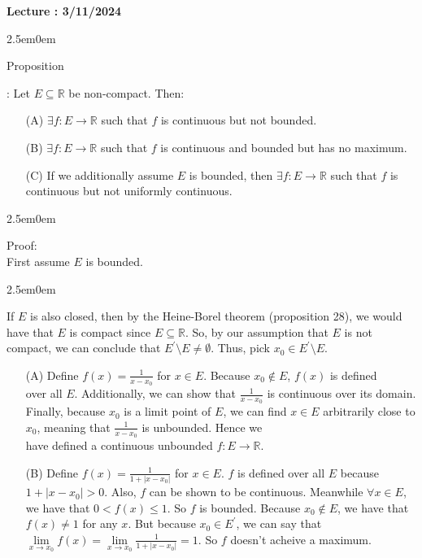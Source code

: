 \documentclass{book}
\newcommand{\hTwo}{%
   \color{MidnightBlue}%
   \fontsize{13}{15}\selectfont%
}
\newcommand{\hThree}{%
   \color{PineGreen}
   \fontsize{13}{15}\selectfont%
}
\newenvironment{myIndent}{%
   \begin{adjustwidth}{2.5em}{0em}%
}{%
   \end{adjustwidth}%
}
\newcommand{\retTwo}{\hfill\bigbreak}
\newcounter{LectureNumber}
\newcommand*{\markLecture}[1]{%
   \stepcounter{LectureNumber}%
   {\huge \color{Black} \textbf{Lecture \theLectureNumber: #1} \newline}%
}
\newcounter{PropNumber}
\newcommand{\propCount}[1][1]{%
   \addtocounter{PropNumber}{#1}%
   \thePropNumber%
}
\begin{document}
   \markLecture{3/11/2024}

   
   {\begin{myIndent} \hTwo
      Proposition \propCount: Let $E \subseteq \mathbb{R}$ be non-compact. Then:
      \begin{itemize}
         \item[(A)] $\exists f: E \rightarrow \mathbb{R}$ such that $f$ is continuous but not bounded.
         \item[(B)] $\exists f: E \rightarrow \mathbb{R}$ such that $f$ is continuous and bounded but has no maximum.
         \item[(C)] If we additionally assume $E$ is bounded, then $\exists f: E \rightarrow \mathbb{R}$ such that $f$ is\\ continuous but not uniformly continuous. \retTwo
      \end{itemize}

      {\begin{myIndent} \hThree
         Proof:\\
         First assume $E$ is bounded.
         \begin{myIndent}
            If $E$ is also closed, then by the Heine-Borel theorem (proposition 28), we would have that $E$ is compact since $E \subseteq \mathbb{R}$. So, by our assumption that $E$ is not compact, we can conclude that $E^\prime \setminus E \neq \emptyset$. Thus, pick $x_0 \in E^\prime \setminus E$. \retTwo
            \begin{itemize}
               \item[(A)] Define $f(x) = \frac{1}{x-x_0}$ for $x \in E$. Because $x_0 \notin E$, $f(x)$ is defined\\ over all $E$. Additionally, we can show that $\frac{1}{x-x_0}$ is continuous over its domain. Finally, because $x_0$ is a limit point of $E$, we can find $x \in E$ arbitrarily close to $x_0$, meaning that $\frac{1}{x-x_0}$ is unbounded. Hence we \\ [1.5pt] have defined a continuous unbounded $f : E \rightarrow \mathbb{R}$.\retTwo
               
               \item[(B)] Define $f(x) = \frac{1}{1 + |x - x_0|}$ for $x \in E$. $f$ is defined over all $E$ because $1 + |x - x_0| > 0$. Also, $f$ can be shown to be continuous. Meanwhile $\forall x \in E$, we have that $0 < f(x) \leq 1$. So $f$ is bounded. Because $x_0 \notin E$, we have that $f(x) \neq 1$ for any $x$. But because $x_0 \in E^\prime$, we can say that $\lim\limits_{x\rightarrow x_0}f(x) = \lim\limits_{x\rightarrow x_0}\frac{1}{1 + |x - x_0|} = 1$. So $f$ doesn't acheive a maximum. 
               

\end{itemize}
\end{myIndent}
\end{myIndent}}
\end{myIndent}}
\end{document}
